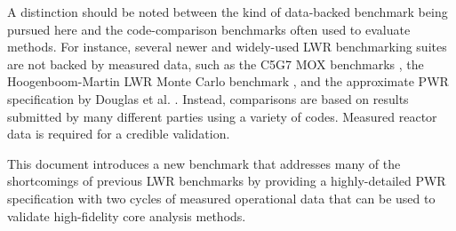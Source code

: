 A distinction should be noted between the kind of data-backed benchmark being
pursued here and the code-comparison benchmarks often used to evaluate methods.
For instance, several newer and widely-used \ac{LWR} benchmarking suites are not
backed by measured data, such as the C5G7 \acs{MOX} benchmarks \cite{c5g7}, the
Hoogenboom-Martin \ac{LWR} Monte Carlo benchmark \cite{mc21_hoomartin2010}, and
the approximate \ac{PWR} specification by Douglas et al.
\cite{Douglass20101384}. Instead, comparisons are based on results submitted by
many different parties using a variety of codes. Measured reactor data is
required for a credible validation.

This document introduces a new benchmark that addresses many of the shortcomings
of previous \ac{LWR} benchmarks by providing a highly-detailed \ac{PWR}
specification with two cycles of measured operational data that can be used to
validate high-fidelity core analysis methods.
